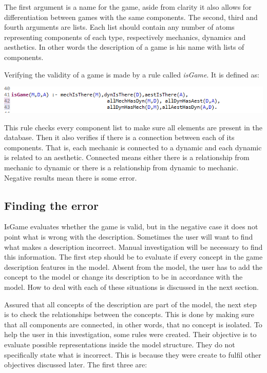 The first argument is a name for the game, aside from clarity it also allows for differentiation between games with the same components. The second, third and fourth arguments are lists. Each list should contain any number of atoms representing components of each type, respectively mechanics, dynamics and aesthetics. In other words the description of a game is his name with lists of components.

Verifying the validity of a game is made by a rule called \textit{isGame}. It is defined as:
\newline

\includegraphics[]{Images/isGameprolog.png}
\newline

This rule checks every component list to make sure all elements are present in the database. Then it also verifies if there is a connection between each of its components. That is, each mechanic is connected to a dynamic and each dynamic is related to an aesthetic. Connected means either there is a relationship from mechanic to dynamic or there is a relationship from dynamic to mechanic. Negative results mean there is some error.

\subsection{Finding the error}

IsGame evaluates whether the game is valid, but in the negative case it does not point what is wrong with the description. Sometimes the user will want to find what makes a description incorrect. Manual investigation will be necessary to find this information. The first step should be to evaluate if every concept in the game description features in the model. Absent from the model, the user has to add the concept to the model or change its description to be in accordance with the model. How to deal with each of these situations is discussed in the next section.

Assured that all concepts of the description are part of the model, the next step is to check the relationships between the concepts. This is done by making sure that all components are connected, in other words, that no concept is isolated. To help the user in this investigation, some rules were created. Their objective is to evaluate possible representations inside the model structure. They do not specifically state what is incorrect. This is because they were create to fulfil other objectives discussed later. The first three are:

